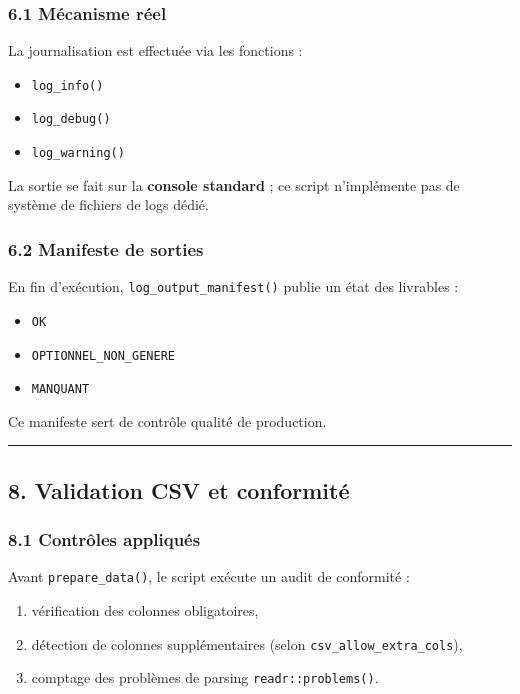 \subsubsection{6.1 Mécanisme réel}\label{muxe9canisme-ruxe9el}

La journalisation est effectuée via les fonctions :

\begin{itemize}
\tightlist
\item
  \texttt{log\_info()}
\item
  \texttt{log\_debug()}
\item
  \texttt{log\_warning()}
\end{itemize}

La sortie se fait sur la \textbf{console standard} ; ce script
n'implémente pas de système de fichiers de logs dédié.

\subsubsection{6.2 Manifeste de sorties}\label{manifeste-de-sorties}

En fin d'exécution, \texttt{log\_output\_manifest()} publie un état des
livrables :

\begin{itemize}
\tightlist
\item
  \texttt{OK}
\item
  \texttt{OPTIONNEL\_NON\_GENERE}
\item
  \texttt{MANQUANT}
\end{itemize}

Ce manifeste sert de contrôle qualité de production.

\begin{center}\rule{0.5\linewidth}{0.5pt}\end{center}

\subsection{8. Validation CSV et
conformité}\label{validation-csv-et-conformituxe9}

\subsubsection{8.1 Contrôles appliqués}\label{contruxf4les-appliquuxe9s}

Avant \texttt{prepare\_data()}, le script exécute un audit de conformité
:

\begin{enumerate}
\def\labelenumi{\arabic{enumi}.}
\tightlist
\item
  vérification des colonnes obligatoires,
\item
  détection de colonnes supplémentaires (selon
  \texttt{csv\_allow\_extra\_cols}),
\item
  comptage des problèmes de parsing \texttt{readr::problems()}.
\end{enumerate}

